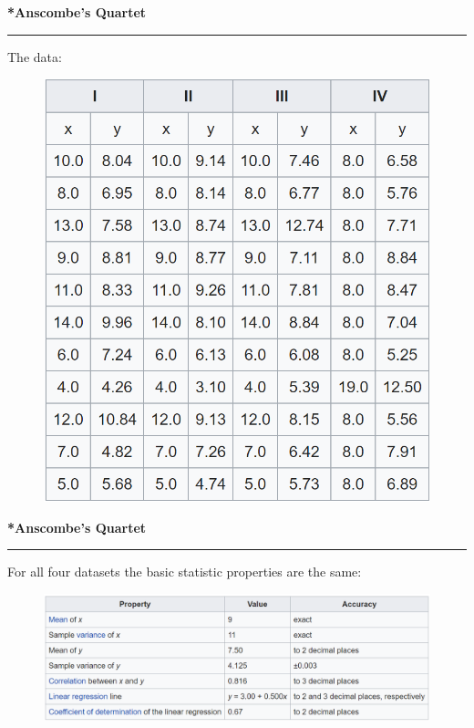 \documentclass[pdf]{beamer}
\begin{document}
\begin{frame}
    {{\textbf{*Anscombe’s Quartet}}}{\textcolor{red}{\rule{12cm}{1.2pt}}}

The data:

\begin{figure}
\includegraphics[scale=0.25]{15_Anscombe's_quartet_Data.png}
\end{figure}

\end{frame}



\begin{frame}
    {{\textbf{*Anscombe’s Quartet}}}{\textcolor{red}{\rule{12cm}{1.2pt}}}

For all four datasets the basic statistic properties are the same:
    
\begin{figure}
\includegraphics[scale=0.5]{15_Anscombe's_quartet_Prop.png}
\end{figure}

\end{frame}
\end{document}
